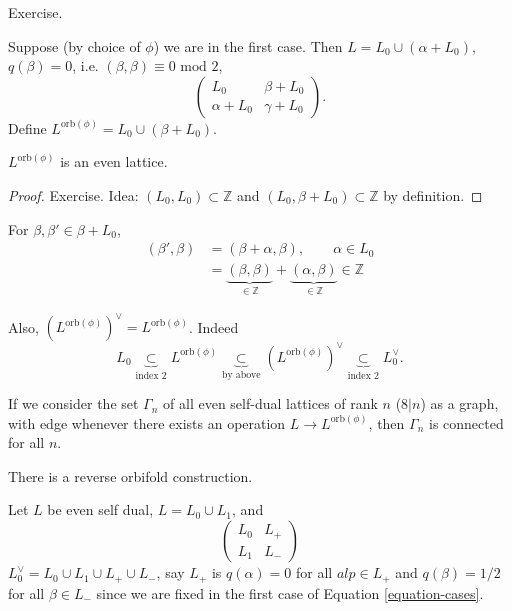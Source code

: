 \noindent
Exercise.

Suppose (by choice of $\phi$) we are in the first case.
Then $L=L_0 \cup  (\alpha+L_0)$, $q(\beta)=0$, i.e.
$(\beta,\beta)\equiv 0 \text{ mod }2$,
$$
\begin{pmatrix}
L_0&\beta+L_0\\ 
\alpha+L_0&\gamma+L_0
\end{pmatrix}.
$$
Define $L^{\text{orb}(\phi)}=L_0 \cup  (\beta+L_0)$.

\begin{lemma}
\label{lemma-even-lattice}
$L^{\text{orb}(\phi)}$ is an even lattice.
\end{lemma}

\begin{proof}
Exercise. Idea: $(L_0,L_0) \subset \mathbb{Z}$ and 
$(L_0,\beta+L_0)\subset \mathbb{Z}$ by definition.
\end{proof}

\noindent
For $\beta,\beta' \in \beta+L_0$,
\begin{align*}
(\beta',\beta)&=(\beta+\alpha,\beta),\qquad \alpha \in L_0\\
&=\underbrace{(\beta,\beta)}_{\in \mathbb{Z}}
+\underbrace{(\alpha,\beta)}_{\in \mathbb{Z}} \in \mathbb{Z}
\end{align*}

\noindent
Also, $(L^{\text{orb}(\phi)})^\vee=L^{\text{orb}(\phi)}$.
Indeed
$$
L_0 \underbrace{\subset}_{\text{index 2}}L^{\text{orb}(\phi)}
\underbrace{\subset}_{\text{by above}}
(L^{\text{orb}(\phi)})^\vee
\underbrace{\subset}_{\text{index 2}}
L_0^\vee.
$$

\begin{theorem}[Niemer]
\label{theorem-niemer}
If we consider the set $\Gamma_n$ of all
even self-dual lattices of rank $n$ ($8|n$)
as a graph, with edge whenever there
exists an operation $L \to L^{\text{orb}(\phi)}$,
then $\Gamma_n$ is connected for all $n$.
\end{theorem}

\begin{remark}
\label{remark-reverse-orbifold}
There is a reverse orbifold construction.
\end{remark}

\noindent
Let $L$ be even self dual, $L=L_0 \cup  L_1$, and
$$
\begin{pmatrix}
L_0&L_+\\ 
L_1&L_-
\end{pmatrix}
$$
$L_0^\vee=L_0 \cup  L_1 \cup  L_+ \cup  L_-$,
say $L_+$ is $q(\alpha)=0$ for all $alp \in L_+$
and $q(\beta)=1/2$ for all $\beta \in L_-$
since we are fixed in the first case of
Equation \ref{equation-cases}.

